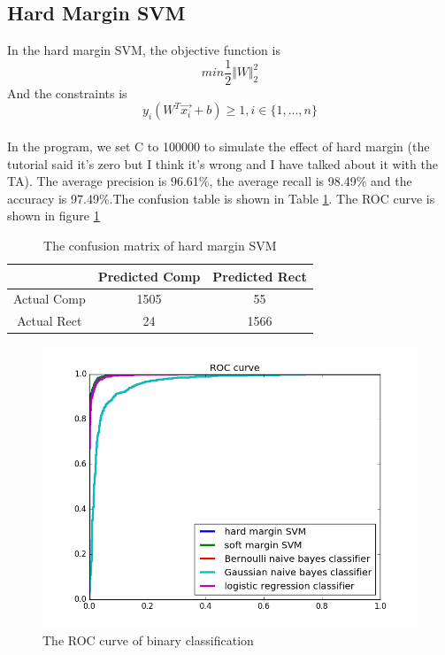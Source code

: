 \documentclass{article}
\begin{document}
\subsection{Hard Margin SVM}
In the hard margin SVM, the objective function is
\begin{equation*}
min \frac{1}{2}\Vert W \Vert _2 ^2
\end{equation*}
And the constraints is
\begin{equation*}
y_i(W^T\overrightarrow{x_i}+b)\geq 1, i\in\lbrace 1, ..., n \rbrace
\end{equation*}
\\
In the program, we set C to 100000 to simulate the effect of hard margin (the tutorial said it's zero but I think it's wrong and I have talked about it with the TA). The average precision is 96.61\%, the average recall is 98.49\% and the accuracy is 97.49\%.The confusion table is shown in Table \ref{tb:confu}. The ROC curve  is shown in figure \ref{fig:roc}
\begin{table}
\begin{center}
\caption{The confusion matrix of hard margin SVM}
\label{tb:confu}
\begin{tabular}{|c|c|c|}
\hline
& Predicted Comp& Predicted Rect\\
\hline
Actual Comp&1505&55\\
\hline
Actual Rect&24&1566\\
\hline 	
\end{tabular}
\end{center}
\end{table}

\begin{figure}[htbp]
\centering
\includegraphics[width=.6\textwidth]{roc.png}
\caption{The ROC curve of binary classification}
\label{fig:roc}
\end{figure}
\end{document}
